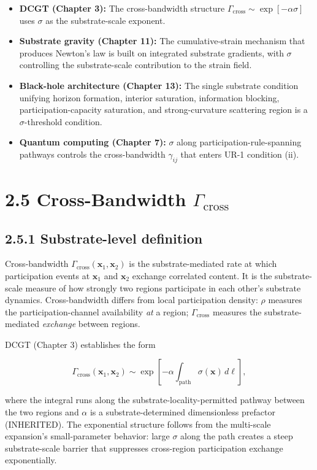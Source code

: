 \documentclass[11pt]{book}
\begin{document}
\begin{itemize}
\item \textbf{DCGT (Chapter 3):} The cross-bandwidth structure $\Gamma_\mathrm{cross} \sim \exp[-\alpha\sigma]$ uses $\sigma$ as the substrate-scale exponent.
\item \textbf{Substrate gravity (Chapter 11):} The cumulative-strain mechanism that produces Newton's law is built on integrated substrate gradients, with $\sigma$ controlling the substrate-scale contribution to the strain field.
\item \textbf{Black-hole architecture (Chapter 13):} The single substrate condition unifying horizon formation, interior saturation, information blocking, participation-capacity saturation, and strong-curvature scattering region is a $\sigma$-threshold condition.
\item \textbf{Quantum computing (Chapter 7):} $\sigma$ along participation-rule-spanning pathways controls the cross-bandwidth $\gamma_{ij}$ that enters UR-1 condition (ii).
\end{itemize}

\section{2.5 Cross-Bandwidth $\Gamma_\mathrm{cross}$}

\subsection{2.5.1 Substrate-level definition}

Cross-bandwidth $\Gamma_\mathrm{cross}(\mathbf{x}_1, \mathbf{x}_2)$ is the substrate-mediated rate at which participation events at $\mathbf{x}_1$ and $\mathbf{x}_2$ exchange correlated content. It is the substrate-scale measure of how strongly two regions participate in each other's substrate dynamics. Cross-bandwidth differs from local participation density: $\rho$ measures the participation-channel availability \textit{at} a region; $\Gamma_\mathrm{cross}$ measures the substrate-mediated \textit{exchange} between regions.

DCGT (Chapter 3) establishes the form

\[
\Gamma_\mathrm{cross}(\mathbf{x}_1, \mathbf{x}_2) \sim \exp\!\left[-\alpha\!\int_\mathrm{path}\sigma(\mathbf{x})\,d\ell\right],
\]

where the integral runs along the substrate-locality-permitted pathway between the two regions and $\alpha$ is a substrate-determined dimensionless prefactor (INHERITED). The exponential structure follows from the multi-scale expansion's small-parameter behavior: large $\sigma$ along the path creates a steep substrate-scale barrier that suppresses cross-region participation exchange exponentially.
\end{document}
